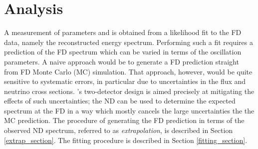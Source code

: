 \chapter{Analysis}
\label{analysis_chapter}

A measurement of parameters \deltamtht and \thetatth is obtained from
a likelihood fit to the FD data, namely the reconstructed energy spectrum.
Performing such a fit requires a prediction of the FD spectrum which can be
varied in terms of the oscillation parameters.
A naive approach would be to generate a FD prediction straight from
FD Monte Carlo (MC) simulation.
That approach, however, would be quite sensitive to systematic errors,
in particular due to uncertainties  in the \numi flux and neutrino
cross sections.
\nova's two-detector design is aimed precisely at mitigating the effects of
such uncertainties; the ND can be used to determine the expected
spectrum at the FD in a way which mostly cancels the large uncertainties the
the MC prediction.
The procedure of generating the FD prediction in terms of the observed
ND spectrum, referred to as \textit{extrapolation}, is described in Section
\ref{extrap_section}.
The fitting procedure is described in Section \ref{fitting_section}.

